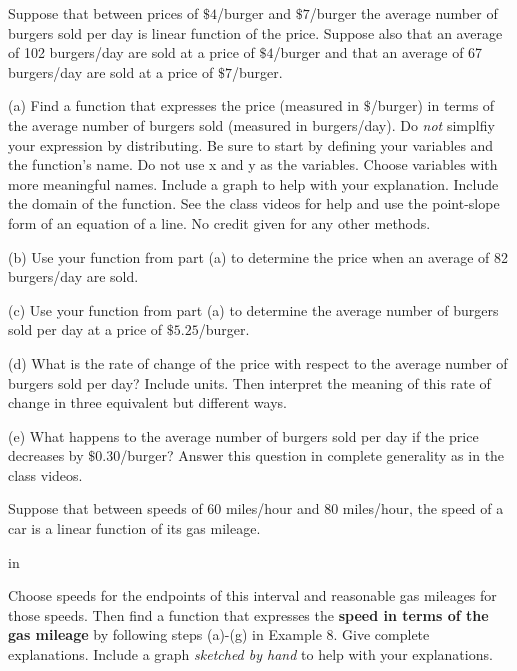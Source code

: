 \documentclass{ximera}
\newcommand{\pskip}{\vskip 0.1 in}
\begin{document}
\begin{question}  \label{Qdsfdsfgnn}
Suppose that between prices of $\$4$/burger and $\$7$/burger the average number of burgers sold per day is linear function of the price. Suppose also that an average of 102 burgers/day are sold at a price of $\$4$/burger and that an average of 67 burgers/day are sold at a price of $\$7$/burger.


(a) Find a function that expresses the price (measured in $\$$/burger) in terms of the average number of burgers sold (measured in burgers/day). Do \emph{not} simplfiy your expression by distributing. Be sure to start by defining your variables and the function’s name. Do not use x and y as the variables. Choose variables with more meaningful names. Include a graph to help with
your explanation. Include the domain of the function. See the class videos for help and use the point-slope form of an equation of a line. No credit given for any other methods.

(b) Use your function from part (a) to determine the price when an average of 82 burgers/day are sold.

(c) Use your function from part (a) to determine the average number of burgers sold per day at a price of $\$5.25$/burger.

(d) What is the rate of change of the price with respect to the average number of burgers sold per day? Include units. Then interpret the meaning of this rate of change in three equivalent but different ways.

(e) What happens to the average number of burgers sold per day if the price decreases by $\$0.30$/burger? Answer this question in complete generality as in the class videos.

\end{question}



\begin{example} \label{Ex6:LF}
Suppose that between speeds of $60$ miles/hour and $80$ miles/hour, the speed of a car is a linear function of its gas mileage. 

\pskip

Choose speeds for the endpoints of this interval and reasonable gas mileages for those speeds. Then find a function that expresses the {\bf speed in terms of the gas mileage} by following steps (a)-(g) in Example 8. Give complete explanations. Include a graph \emph{sketched by hand} to help with your explanations.
\end{example}
\end{document}
